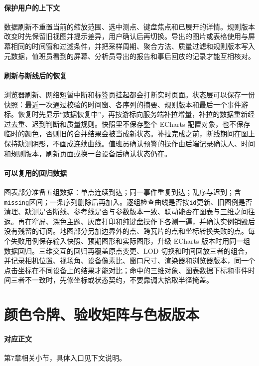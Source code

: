 \paragraph{保护用户的上下文}数据刷新不重置当前的缩放范围、选中测点、键盘焦点和已展开的详情。规则版本改变时先保留旧视图并提示差异，用户确认后再切换。导出的图片或表格使用与屏幕相同的时间窗和过滤条件，并把采样周期、聚合方法、质量过滤和规则版本写入元数据，值班员看到的屏幕、分析员导出的报告和事后回放的记录才能互相核对。

\paragraph{刷新与断线后的恢复}浏览器刷新、网络短暂中断和标签页挂起都会打断实时页面。状态层可以保存一份快照：最近一次通过校验的时间窗、各序列的摘要、规则版本和最后一个事件游标。恢复时先显示“数据恢复中”，再按游标向服务端补拉增量，补拉的数据重新经过去重、迟到判断和质量规则。快照里不保存整个 ECharts 配置对象，也不保存临时的颜色，否则旧的合并结果会被当成新状态。补拉完成之前，断线期间在图上保持缺测阴影，不画成连续曲线。值班员确认预警的操作由后端记录确认人、时间和规则版本，刷新页面或换一台设备后确认状态仍在。

\paragraph{可以复用的回归数据}图表部分准备五组数据：单点连续到达；同一事件重复到达；乱序与迟到；含\texttt{missing}区间；一条序列删除后再加入。逐组检查曲线是否按\texttt{id}更新、旧图例是否清理、缺测是否断线、参考线是否与参数版本一致、联动能否在图表与三维之间往返。再在窄屏、深色主题、灰度打印和纯键盘操作下各测一遍，并确认实例销毁后没有残留的订阅。地图部分另加边界外的点、跨瓦片的点和坐标转换失败的点。每个失败用例保存输入快照、预期图形和实际图形，升级 ECharts 版本时用同一组数据回归。三维交互的回归再覆盖原点变更、LOD 切换和时间回放三者的组合，并记录相机位置、视场角、设备像素比、窗口尺寸、渲染器和浏览器版本，同一个点击坐标在不同设备上的结果才能对比；命中的三维对象、图表数据下标和事件时间三者不一致时，先修坐标或状态契约，不要靠调大拾取半径掩盖。



\section{颜色令牌、验收矩阵与色板版本}\label{app:ext-ch07-color-tokens}

\paragraph{对应正文}第7章相关小节，具体入口见下文说明。

